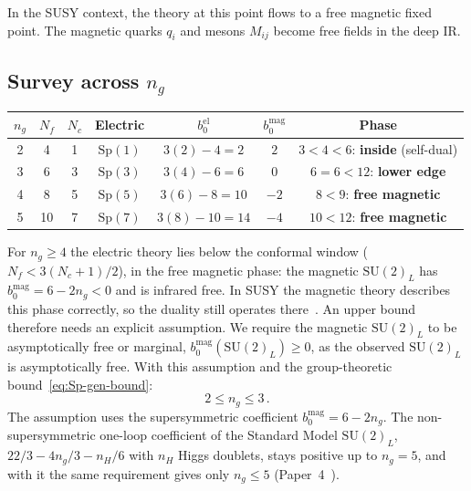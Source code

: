 \documentclass[11pt,a4paper]{article}
\theoremstyle{plain}
\theoremstyle{definition}
\theoremstyle{remark}
\newcommand{\Nc}{N_{\!c}}
\newcommand{\Nf}{N_{\!f}}
\newcommand{\SU}[1]{\mathrm{SU}(#1)}
\newcommand{\Sp}[1]{\mathrm{Sp}(#1)}
\begin{document}
In the SUSY context, the theory at this point flows to a free
magnetic fixed point.  The magnetic quarks $q_i$ and mesons $M_{ij}$
become free fields in the deep IR.

\subsection{Survey across $n_g$}

\begin{center}
\renewcommand{\arraystretch}{1.4}
\begin{tabular}{c c c c c c c}
\toprule
$n_g$ & $\Nf$ & $\Nc$ & Electric & $b_0^{\mathrm{el}}$ &
  $b_0^{\mathrm{mag}}$ & Phase \\
\midrule
2 & 4 & 1 & $\Sp{1}$ & $3(2) - 4 = 2$ & $2$ &
  $3 < 4 < 6$: \textbf{inside} (self-dual) \\
3 & 6 & 3 & $\Sp{3}$ & $3(4) - 6 = 6$ & $0$ &
  $6 = 6 < 12$: \textbf{lower edge} \\
4 & 8 & 5 & $\Sp{5}$ & $3(6) - 8 = 10$ & $-2$ &
  $8 < 9$: \textbf{free magnetic} \\
5 & 10 & 7 & $\Sp{7}$ & $3(8) - 10 = 14$ & $-4$ &
  $10 < 12$: \textbf{free magnetic} \\
\bottomrule
\end{tabular}
\end{center}

For $n_g \geq 4$ the electric theory lies below the conformal window
($\Nf < 3(\Nc+1)/2$), in the free magnetic phase: the magnetic
$\SU{2}_L$ has $b_0^{\mathrm{mag}} = 6 - 2n_g < 0$ and is infrared free.
In SUSY the magnetic theory describes this phase correctly, so the
duality still operates there~\cite{IS1995}.  An upper bound therefore
needs an explicit assumption.  We require the magnetic $\SU{2}_L$ to be
asymptotically free or marginal, $b_0^{\mathrm{mag}}(\SU{2}_L) \geq 0$,
as the observed $\SU{2}_L$ is asymptotically free.  With this assumption
and the group-theoretic bound~\eqref{eq:Sp-gen-bound}:
\begin{equation}\label{eq:Sp-ng-range}
  \boxed{2 \leq n_g \leq 3}\,.
\end{equation}
The assumption uses the supersymmetric coefficient
$b_0^{\mathrm{mag}} = 6 - 2n_g$.  The non-supersymmetric one-loop
coefficient of the Standard Model $\SU{2}_L$,
$22/3 - 4n_g/3 - n_H/6$ with $n_H$ Higgs doublets, stays positive up to
$n_g = 5$, and with it the same requirement gives only $n_g \leq 5$
(Paper~4~\cite{Paper4}).


\end{document}

